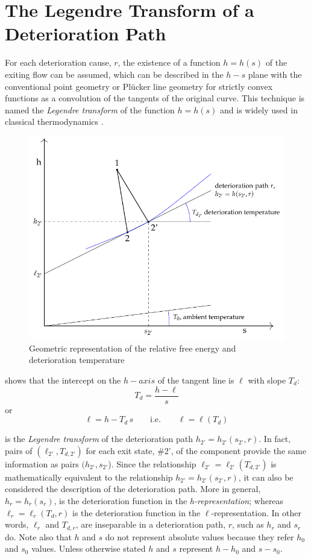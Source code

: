 \documentclass[energies,article,submit,moreauthors,pdftex]{Definitions/mdpi}
\begin{document}
\section{The Legendre Transform of a Deterioration Path}
For each deterioration cause, $r$, the existence of a function $h = h(s)$ of the exiting flow can be assumed, which can be described in the $h-s$ plane with the conventional point geometry or Plücker line geometry for strictly convex functions as a convolution of the tangents of the original curve. This technique is named the \emph{Legendre transform} of the function $h = h(s)$ and is widely used in classical thermodynamics \cite{Callen1985,Alberty2001}.

\begin{figure}[ht]
	\centering
	\includegraphics[scale=0.78]{rfe.pdf}
	\caption{Geometric representation of the relative free energy and deterioration temperature}
	\label{fig:rfe}
\end{figure}

 shows that the intercept on the $h-axis$ of the tangent line is $\ell$ with slope $T_d$:
\[
T_d=\frac{h-\ell}{s}
\]
or
\begin{equation}
\ell=h-T_d\,s \qquad \text{i.e.} \qquad \ell=\ell(T_d)
\label{eq:lgdr}
\end{equation}

 is the \emph{Legendre transform} of the deterioration path $h_{2'}=h_{2'}(s_{2'},r)$. In fact, pairs of $(\ell_{2'} , T_{d,2'})$ for each exit state, \#2', of the component provide the same information as pairs $(h_{2'},s_{2'}$). Since the relationship  $\ell_{2'} = \ell_{2'}(T_{d,2'})$ is mathematically equivalent to the relationship $h_{2'} = h_{2'} (s_{2'}, r)$, it can also be considered the description of the deterioration path. More in general, $h_r=h_r (s_r)$, is the deterioration function in the \emph{h-representation}; whereas $\ell_r = \ell_r(T_d,r)$ is the deterioration function in the $\ell$-representation. In other words, $\ell_r$ and $T_{d,r}$, are inseparable in a deterioration path, $r$, such as $h_r$ and $s_r$ do. Note also that $h$ and $s$ do not represent absolute values because they refer $h_0$ and $s_0$ values. Unless otherwise stated $h$ and $s$ represent $h-h_0$ and $s-s_0$.
\end{document}
